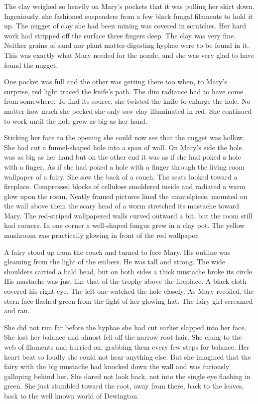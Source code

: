 \documentclass[10pt, draft]{memoir}
\begin{document}
The clay weighed so heavily on Mary's pockets that it was pulling her skirt
down. Ingeniously, she fashioned suspenders from a few black fungal filaments
to hold it up. The nugget of clay she had been mining was covered in scratches.
Her hard work had stripped off the surface three fingers deep. The clay was
very fine. Neither grains of sand nor plant matter-digesting hyphae were to be
found in it. This was exactly what Mary needed for the nozzle, and she was very
glad to have found the nugget.

One pocket was full and the other was getting there too when, to Mary's
surprise, red light traced the knife's path. The dim radiance had to have come
from somewhere. To find its source, she twisted the knife to enlarge the hole.
No matter how much she peeked she only saw clay illuminated in red. She
continued to work until the hole grew as big as her hand.

Sticking her face to the opening she could now see that the nugget was hollow.
She had cut a funnel-shaped hole into a span of wall. On Mary's side the hole
was as big as her hand but on the other end it was as if she had poked a hole
with a finger. As if she had poked a hole with a finger through the living room
wallpaper of a fairy. She saw the back of a couch. The seats looked toward a
fireplace. Compressed blocks of cellulose smoldered inside and radiated a warm
glow upon the room. Neatly framed pictures lined the mantelpiece, mounted on
the wall above them the scary head of a worm stretched its mustache toward
Mary. The red-striped wallpapered walls curved outward a bit, but the room
still had corners. In one corner a well-shaped fungus grew in a clay pot. The
yellow mushroom was practically glowing in front of the red wallpaper.

A fairy stood up from the couch and turned to face Mary. His outline was
gleaming from the light of the embers. He was tall and strong. The wide
shoulders carried a bald head, but on both sides a thick mustache broke its
circle. His mustache was just like that of the trophy above the fireplace. A
black cloth covered his right eye. The left one watched the hole closely. As
Mary recoiled, the stern face flashed green from the light of her glowing hat.
The fairy girl screamed and ran.

She did not run far before the hyphae she had cut earlier slapped into her
face. She lost her balance and almost fell off the narrow root hair. She clung
to the web of filaments and hurried on, grabbing them every few steps for
balance. Her heart beat so loudly she could not hear anything else. But she
imagined that the fairy with the big mustache had knocked down the wall and was
furiously galloping behind her. She dared not look back, not into the single
eye flashing in green. She just stumbled toward the root, away from there, back
to the leaves, back to the well known world of Dewington.
\end{document}
